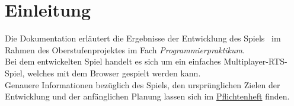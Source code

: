 \section{Einleitung}
Die Dokumentation erläutert die Ergebnisse der Entwicklung des Spiels \vires\ im Rahmen des Oberstufenprojektes im Fach \textit{Programmierpraktikum}. \\
Bei dem entwickelten Spiel handelt es sich um ein einfaches Multiplayer-RTS-Spiel, welches mit dem Browser gespielt werden kann. \\
Genauere Informationen bezüglich des Spiels, den ursprünglichen Zielen der Entwicklung und der anfänglichen Planung lassen sich im \href{https://github.com/mhuisi/vires/raw/master/doc/fsd/vires.pdf}{Pflichtenheft} finden.